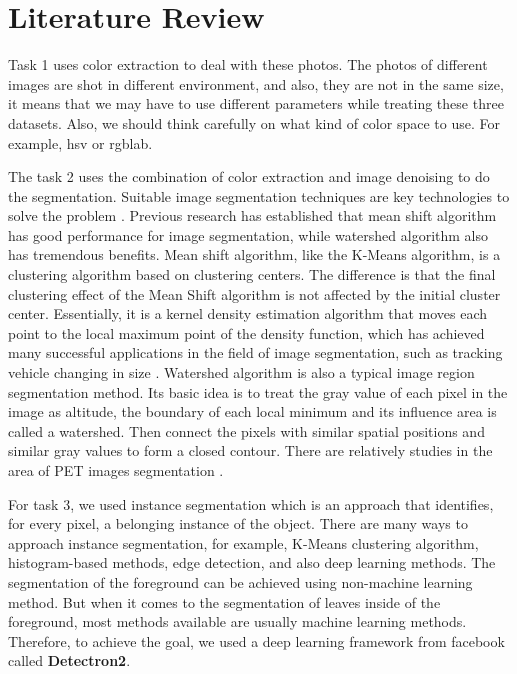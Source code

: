 \documentclass[conference]{IEEEtran}
\begin{document}
\section{Literature Review}

Task 1 uses color extraction to deal with these photos. The photos of different images are shot in different environment, and also, they are not in the same size, it means that we may have to use different parameters while treating these three datasets. Also, we should think carefully on what kind of color space to use. For example, hsv or rgblab.

The task 2 uses the combination of color extraction and image denoising to do the segmentation. Suitable image segmentation techniques are key technologies to solve the problem \cite{pal1993review}. Previous research has established that mean shift algorithm has good performance for image segmentation, while watershed algorithm also has tremendous benefits. Mean shift algorithm, like the K-Means algorithm, is a clustering algorithm based on clustering centers. The difference is that the final clustering effect of the Mean Shift algorithm is not affected by the initial cluster center. Essentially, it is a kernel density estimation algorithm that moves each point to the local maximum point of the density function, which has achieved many successful applications in the field of image segmentation, such as tracking vehicle changing in size \cite{peng2005automatic}. Watershed algorithm is also a typical image region segmentation method. Its basic idea is to treat the gray value of each pixel in the image as altitude, the boundary of each local minimum and its influence area is called a watershed. Then connect the pixels with similar spatial positions and similar gray values to form a closed contour. There are relatively studies in the area of PET images segmentation \cite{riddell1999watershed}.

For task 3, we used instance segmentation \cite{Hafiz_2020} which is an approach that identifies, for every pixel, a belonging instance of the object. There are many ways to approach instance segmentation, for example, K-Means clustering algorithm, histogram-based methods, edge detection, and also deep learning methods. The segmentation of the foreground can be achieved using non-machine learning method. But when it comes to the segmentation of leaves inside of the foreground, most methods available are usually machine learning methods. Therefore, to achieve the goal, we used a deep learning framework from facebook called  \textbf{Detectron2}. 
\end{document}
